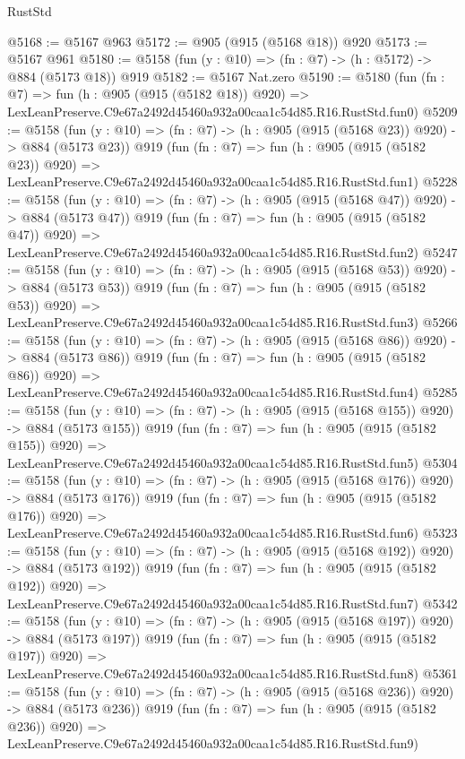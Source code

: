 \begin{lexlean}{RustStd}
\begin{coremodule}
@5168 := @5167 @963
@5172 := @905 (@915 (@5168 @18)) @920
@5173 := @5167 @961
@5180 := @5158 (fun (y : @10) => (fn : @7) -> (h : @5172) -> @884 (@5173 @18)) @919
@5182 := @5167 Nat.zero
@5190 := @5180
    (fun (fn : @7) =>
    fun (h : @905 (@915 (@5182 @18)) @920) =>
    LexLeanPreserve.C9e67a2492d45460a932a00caa1c54d85.R16.RustStd.fun0)
@5209 := @5158
    (fun (y : @10) => (fn : @7) -> (h : @905 (@915 (@5168 @23)) @920) -> @884 (@5173 @23))
    @919
    (fun (fn : @7) =>
    fun (h : @905 (@915 (@5182 @23)) @920) =>
    LexLeanPreserve.C9e67a2492d45460a932a00caa1c54d85.R16.RustStd.fun1)
@5228 := @5158
    (fun (y : @10) => (fn : @7) -> (h : @905 (@915 (@5168 @47)) @920) -> @884 (@5173 @47))
    @919
    (fun (fn : @7) =>
    fun (h : @905 (@915 (@5182 @47)) @920) =>
    LexLeanPreserve.C9e67a2492d45460a932a00caa1c54d85.R16.RustStd.fun2)
@5247 := @5158
    (fun (y : @10) => (fn : @7) -> (h : @905 (@915 (@5168 @53)) @920) -> @884 (@5173 @53))
    @919
    (fun (fn : @7) =>
    fun (h : @905 (@915 (@5182 @53)) @920) =>
    LexLeanPreserve.C9e67a2492d45460a932a00caa1c54d85.R16.RustStd.fun3)
@5266 := @5158
    (fun (y : @10) => (fn : @7) -> (h : @905 (@915 (@5168 @86)) @920) -> @884 (@5173 @86))
    @919
    (fun (fn : @7) =>
    fun (h : @905 (@915 (@5182 @86)) @920) =>
    LexLeanPreserve.C9e67a2492d45460a932a00caa1c54d85.R16.RustStd.fun4)
@5285 := @5158
    (fun (y : @10) => (fn : @7) -> (h : @905 (@915 (@5168 @155)) @920) -> @884 (@5173 @155))
    @919
    (fun (fn : @7) =>
    fun (h : @905 (@915 (@5182 @155)) @920) =>
    LexLeanPreserve.C9e67a2492d45460a932a00caa1c54d85.R16.RustStd.fun5)
@5304 := @5158
    (fun (y : @10) => (fn : @7) -> (h : @905 (@915 (@5168 @176)) @920) -> @884 (@5173 @176))
    @919
    (fun (fn : @7) =>
    fun (h : @905 (@915 (@5182 @176)) @920) =>
    LexLeanPreserve.C9e67a2492d45460a932a00caa1c54d85.R16.RustStd.fun6)
@5323 := @5158
    (fun (y : @10) => (fn : @7) -> (h : @905 (@915 (@5168 @192)) @920) -> @884 (@5173 @192))
    @919
    (fun (fn : @7) =>
    fun (h : @905 (@915 (@5182 @192)) @920) =>
    LexLeanPreserve.C9e67a2492d45460a932a00caa1c54d85.R16.RustStd.fun7)
@5342 := @5158
    (fun (y : @10) => (fn : @7) -> (h : @905 (@915 (@5168 @197)) @920) -> @884 (@5173 @197))
    @919
    (fun (fn : @7) =>
    fun (h : @905 (@915 (@5182 @197)) @920) =>
    LexLeanPreserve.C9e67a2492d45460a932a00caa1c54d85.R16.RustStd.fun8)
@5361 := @5158
    (fun (y : @10) => (fn : @7) -> (h : @905 (@915 (@5168 @236)) @920) -> @884 (@5173 @236))
    @919
    (fun (fn : @7) =>
    fun (h : @905 (@915 (@5182 @236)) @920) =>
    LexLeanPreserve.C9e67a2492d45460a932a00caa1c54d85.R16.RustStd.fun9)

\end{coremodule}
\end{lexlean}
